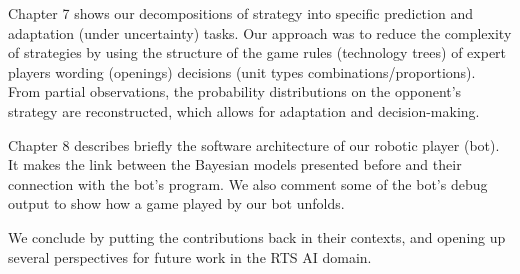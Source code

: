 Chapter 7 shows our decompositions of strategy into specific prediction and adaptation (under uncertainty) tasks. Our approach was to reduce the complexity of strategies by using the structure of the game rules (technology trees) of expert players wording (openings) decisions (unit types combinations/proportions). From partial observations, the probability distributions on the opponent's strategy are reconstructed, which allows for adaptation and decision-making.

Chapter 8 describes briefly the software architecture of our robotic player (bot). It makes the link between the Bayesian models presented before and their connection with the bot's program. We also comment some of the bot's debug output to show how a game played by our bot unfolds.

We conclude by putting the contributions back in their contexts, and opening up several perspectives for future work in the RTS AI domain.



